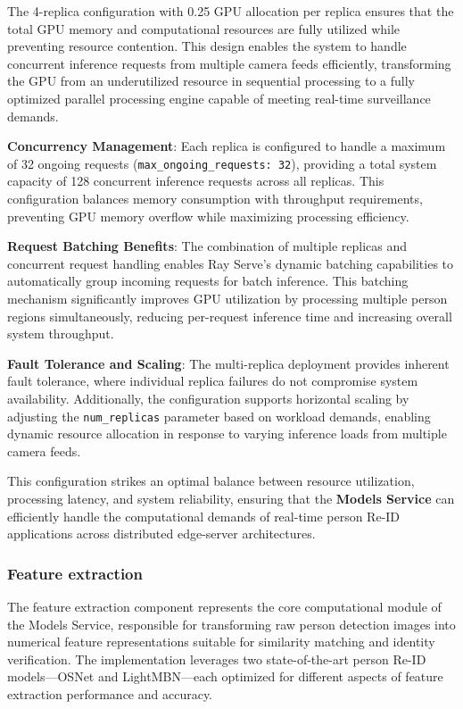 The 4-replica configuration with 0.25 GPU allocation per replica ensures that the total GPU memory and computational resources are fully utilized while preventing resource contention. This design enables the system to handle concurrent inference requests from multiple camera feeds efficiently, transforming the GPU from an underutilized resource in sequential processing to a fully optimized parallel processing engine capable of meeting real-time surveillance demands.

\textbf{Concurrency Management}: Each replica is configured to handle a maximum of 32 ongoing requests (\texttt{max\_ongoing\_requests: 32}), providing a total system capacity of 128 concurrent inference requests across all replicas. This configuration balances memory consumption with throughput requirements, preventing GPU memory overflow while maximizing processing efficiency.

\textbf{Request Batching Benefits}: The combination of multiple replicas and concurrent request handling enables Ray Serve's dynamic batching capabilities to automatically group incoming requests for batch inference. This batching mechanism significantly improves GPU utilization by processing multiple person regions simultaneously, reducing per-request inference time and increasing overall system throughput.

\textbf{Fault Tolerance and Scaling}: The multi-replica deployment provides inherent fault tolerance, where individual replica failures do not compromise system availability. Additionally, the configuration supports horizontal scaling by adjusting the \texttt{num\_replicas} parameter based on workload demands, enabling dynamic resource allocation in response to varying inference loads from multiple camera feeds.

This configuration strikes an optimal balance between resource utilization, processing latency, and system reliability, ensuring that the \textbf{Models Service} can efficiently handle the computational demands of real-time person Re-ID applications across distributed edge-server architectures.

\subsubsection{Feature extraction}

The feature extraction component represents the core computational module of the Models Service, responsible for transforming raw person detection images into numerical feature representations suitable for similarity matching and identity verification. The implementation leverages two state-of-the-art person Re-ID models—OSNet and LightMBN—each optimized for different aspects of feature extraction performance and accuracy.

